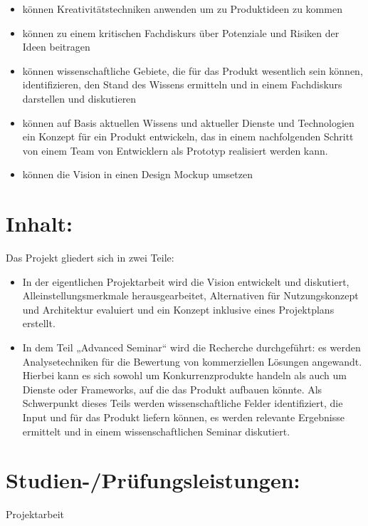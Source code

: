 \begin{itemize}
\item
  können Kreativitätstechniken anwenden um zu Produktideen zu kommen
\item
  können zu einem kritischen Fachdiskurs über Potenziale und Risiken der
  Ideen beitragen
\item
  können wissenschaftliche Gebiete, die für das Produkt wesentlich sein
  können, identifizieren, den Stand des Wissens ermitteln und in einem
  Fachdiskurs darstellen und diskutieren
\item
  können auf Basis aktuellen Wissens und aktueller Dienste und
  Technologien ein Konzept für ein Produkt entwickeln, das in einem
  nachfolgenden Schritt von einem Team von Entwicklern als Prototyp
  realisiert werden kann.
\item
  können die Vision in einen Design Mockup umsetzen
\end{itemize}

\section*{Inhalt:}\label{inhalt-10}

Das Projekt gliedert sich in zwei Teile:

\begin{itemize}
\item
  In der eigentlichen Projektarbeit wird die Vision entwickelt und
  diskutiert, Alleinstellungsmerkmale herausgearbeitet, Alternativen für
  Nutzungskonzept und Architektur evaluiert und ein Konzept inklusive
  eines Projektplans erstellt.
\item
  In dem Teil „Advanced Seminar`` wird die Recherche durchgeführt: es
  werden Analysetechniken für die Bewertung von kommerziellen Lösungen
  angewandt. Hierbei kann es sich sowohl um Konkurrenzprodukte handeln
  als auch um Dienste oder Frameworks, auf die das Produkt aufbauen
  könnte. Als Schwerpunkt dieses Teils werden wissenschaftliche Felder
  identifiziert, die Input und für das Produkt liefern können, es werden
  relevante Ergebnisse ermittelt und in einem wissenschaftlichen Seminar
  diskutiert.
\end{itemize}

\section*{Studien-/Prüfungsleistungen:}\label{studien-pruxfcfungsleistungen-10}

Projektarbeit

